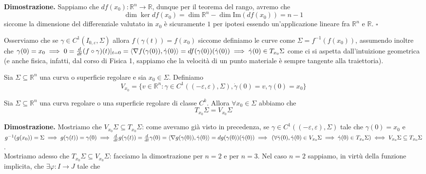 \noindent \textbf{Dimostrazione. }
Sappiamo che $df(x_0): \mathbb{R}^n \to \mathbb{R}$, dunque per il teorema del rango, avremo che
$$
\dim{\ker{df(x_0)}} = \dim{\mathbb{R}^n} - \dim{\text{Im}(df(x_0))} = n - 1
$$
siccome la dimensione del differenziale valutato in $x_0$ è sicuramente $1$ per ipotesi essendo un'applicazione lineare fra $\mathbb{R}^n$ e $\mathbb{R}$.
\hfill $\square$

Osserviamo che se $\gamma \in C^1 (I_{0, \varepsilon}, \Sigma)$ allora $f(\gamma(t)) = f(x_0)$ siccome definiamo le curve come $\Sigma = f^{-1}(f(x_0))$, assumendo inoltre che $\gamma(0) = x_0 \implies 0 = \frac{d}{dt} (f \circ \gamma)(t)|_{t=0} = \langle \nabla f(\gamma(0)), \dot{\gamma}(0) \rangle = df(\gamma(0))(\dot{\gamma}(0)) \implies \dot{\gamma}(0) \in T_{x_0} \Sigma$ come ci si aspetta dall'intuizione geometrica (e anche fisica, infatti, dal corso di Fisica 1, sappiamo che la velocità di un punto materiale è sempre tangente alla traiettoria). 

\vspace{0.5cm}
\begin{definition}[\textcolor{blue}{Spazio delle velocità}]
Sia $\Sigma \subseteq \mathbb{R}^n$ una curva o superficie regolare e sia $x_0 \in \Sigma$. Definiamo
$$
V_{x_0} = \{ v \in \mathbb{R}^n: \gamma \in C^{1}((-\varepsilon, \varepsilon), \Sigma), \dot{\gamma}(0) = v, \gamma(0) = x_0 \}
$$
\end{definition}

\begin{theorem}[\textcolor{blue}{Caratterizzazione del tangente}]
Sia $\Sigma \subseteq \mathbb{R}^n$ una curva regolare o una superficie regolare di classe $C^k$. Allora $\forall x_0 \in \Sigma$ abbiamo che
$$
T_{x_0} \Sigma = V_{x_0} \Sigma
$$
\label{thm:caratt_tang}
\end{theorem}

\noindent \textbf{Dimostrazione. }
Mostriamo che $V_{x_0} \Sigma \subseteq T_{x_0} \Sigma$: come avevamo già visto in precedenza, se $\gamma \in C^{1}((-\varepsilon, \varepsilon), \Sigma)$ tale che $\gamma(0)=x_0$ e $g^{-1}(g(x_0)) = \Sigma \implies g(\gamma(t)) = \gamma(0) \implies \frac{d}{dt} g(\gamma(t)) = \frac{d}{dt} \gamma(0) = \langle \nabla g(\gamma(0)), \dot{\gamma}(0) \rangle = dg(\gamma(0))(\dot{\gamma}(0)) \implies \, (\forall \dot{\gamma}(0), \dot{\gamma}(0) \in V_{x_0} \Sigma \implies \dot{\gamma}(0) \in T_{x_0} \Sigma) \iff V_{x_0} \Sigma \subseteq T_{x_0} \Sigma$. \\
Mostriamo adesso che $T_{x_0} \Sigma \subseteq V_{x_0} \Sigma$: facciamo la dimostrazione per $n=2$ e per $n=3$. Nel caso $n=2$ sappiamo, in virtù della funzione implicita, che $\exists \varphi: I \to J$ tale che
 

